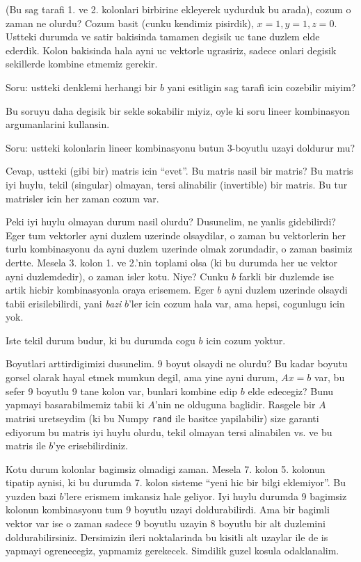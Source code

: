 \documentclass[12pt,fleqn]{article}\usepackage{../common}
\begin{document}
(Bu sag tarafi 1. ve 2. kolonlari birbirine ekleyerek uydurduk bu arada),
cozum o zaman ne olurdu? Cozum basit (cunku kendimiz pisirdik),
$x=1,y=1,z=0$. Ustteki durumda ve satir bakisinda tamamen degisik uc tane
duzlem elde ederdik. Kolon bakisinda hala ayni uc vektorle ugrasiriz,
sadece onlari degisik sekillerde kombine etmemiz gerekir. 

Soru: ustteki denklemi herhangi bir $b$ yani esitligin sag tarafi icin
cozebilir miyim? 

Bu soruyu daha degisik bir sekle sokabilir miyiz, oyle ki soru lineer
kombinasyon argumanlarini kullansin. 

Soru: ustteki kolonlarin lineer kombinasyonu butun 3-boyutlu uzayi doldurur
mu?

Cevap, ustteki (gibi bir) matris icin ``evet''. Bu matris nasil bir matris?
Bu matris iyi huylu, tekil (singular) olmayan, tersi alinabilir
(invertible) bir matris. Bu tur matrisler icin her zaman cozum var. 

Peki iyi huylu olmayan durum nasil olurdu? Dusunelim, ne yanlis
gidebilirdi? Eger tum vektorler ayni duzlem uzerinde olsaydilar, o zaman bu
vektorlerin her turlu kombinasyonu da ayni duzlem uzerinde olmak
zorundadir, o zaman basimiz dertte. Mesela 3. kolon 1. ve 2.'nin toplami
olsa (ki bu durumda her uc vektor ayni duzlemdedir), o zaman isler
kotu. Niye? Cunku $b$ farkli bir duzlemde ise artik hicbir kombinasyonla
oraya erisemem. Eger $b$ ayni duzlem uzerinde olsaydi tabii erisilebilirdi,
yani {\em bazi} $b$'ler icin cozum hala var, ama hepsi, cogunlugu icin yok. 

Iste tekil durum budur, ki bu durumda cogu $b$ icin cozum yoktur.

Boyutlari arttirdigimizi dusunelim. 9 boyut olsaydi ne olurdu? Bu kadar
boyutu gorsel olarak hayal etmek mumkun degil, ama yine ayni durum, $Ax=b$
var, bu sefer 9 boyutlu 9 tane kolon var, bunlari kombine edip $b$ elde
edecegiz? Bunu yapmayi basarabilmemiz tabii ki $A$'nin ne olduguna
baglidir. Rasgele bir $A$ matrisi uretseydim (ki bu Numpy \verb!rand! ile
basitce yapilabilir) size garanti ediyorum bu matris iyi huylu olurdu,
tekil olmayan tersi alinabilen vs. ve bu matris ile $b$'ye
erisebilirdiniz. 

Kotu durum kolonlar bagimsiz olmadigi zaman. Mesela 7. kolon 5. kolonun
tipatip aynisi, ki bu durumda 7. kolon sisteme ``yeni hic bir bilgi
eklemiyor''. Bu yuzden bazi $b$'lere erismem imkansiz hale geliyor. Iyi
huylu durumda 9 bagimsiz kolonun kombinasyonu tum 9 boyutlu uzayi
doldurabilirdi. Ama bir bagimli vektor var ise o zaman sadece 9 boyutlu
uzayin 8 boyutlu bir alt duzlemini doldurabilirsiniz. Dersimizin ileri
noktalarinda bu kisitli alt uzaylar ile de is yapmayi ogrenecegiz, yapmamiz
gerekecek. Simdilik guzel kosula odaklanalim.  
\end{document}
